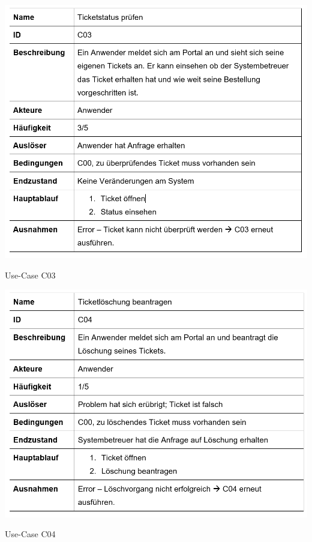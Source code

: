 \vspace{-.5cm}	
\begin{table}[h]
	\centering
	\includegraphics[scale=0.62]{figures/C03.png}
	\caption{Use-Case C03}
	\label{Abb_C03}
\end{table}
\newpage
\vspace{-.5cm}	
\begin{table}[h]
	\centering
	\includegraphics[scale=0.62]{figures/C04.png}
	\caption{Use-Case C04}
	\label{Abb_C04}
\end{table}



